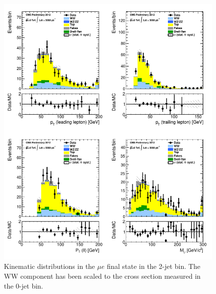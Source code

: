 \begin{figure}[!hbtp]
\centering
\includegraphics[width=1\textwidth]{figures/ww_analysis20_0_ALL_me_2j.pdf} %
\caption{Kinematic distributions in the $\mu e$ final state in the 2-jet bin.
The WW component has been scaled to the cross section measured in the 0-jet bin.}
\label{fig:xs_kinematics_me_2j}
\end{figure}
